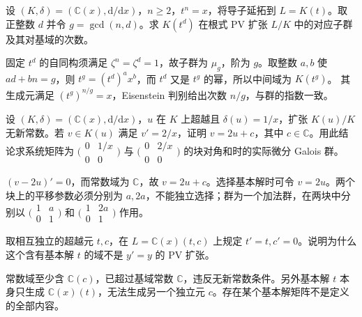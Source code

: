 \begin{exercise}
	设 \((K,\delta)=(\mathbb C(x),\mathrm d/\mathrm dx)\)，\(n\ge2\)，\(t^n=x\)，将导子延拓到 \(L=K(t)\)。取正整数 \(d\) 并令 \(g=\gcd(n,d)\)。求 \(K(t^d)\) 在根式 PV 扩张 \(L/K\) 中的对应子群及其对基域的次数。
\end{exercise}
\begin{solution}
	固定 \(t^d\) 的自同构须满足 \(\zeta^n=\zeta^d=1\)，故子群为 \(\mu_g\)，阶为 \(g\)。取整数 \(a,b\) 使 \(ad+bn=g\)，则 \(t^g=(t^d)^ax^b\)，而 \(t^d\) 又是 \(t^g\) 的幂，所以中间域为 \(K(t^g)\)。 其生成元满足 \((t^g)^{n/g}=x\)，Eisenstein 判别给出次数 \(n/g\)，与群的指数一致。
\end{solution}

\begin{exercise}
	设 \((K,\delta)=(\mathbb C(x),\mathrm d/\mathrm dx)\)，\(u\) 在 \(K\) 上超越且 \(\delta(u)=1/x\)，扩张 \(K(u)/K\) 无新常数。若 \(v\in K(u)\) 满足 \(v'=2/x\)，证明 \(v=2u+c\)，其中 \(c\in\mathbb C\)。用此结论求系统矩阵为 \(\bigl(\begin{smallmatrix}0&1/x\\0&0\end{smallmatrix}\bigr)\) 与 \(\bigl(\begin{smallmatrix}0&2/x\\0&0\end{smallmatrix}\bigr)\) 的块对角和时的实际微分 Galois 群。
\end{exercise}
\begin{solution}
	\((v-2u)'=0\)，而常数域为 \(\mathbb C\)，故 \(v=2u+c\)。选择基本解时可令 \(v=2u\)。两个块上的平移参数必须分别为 \(a,2a\)，不能独立选择；群为一个加法群，在两块中分别以
	\(\bigl(\begin{smallmatrix}1&a\\0&1\end{smallmatrix}\bigr)\) 和
	\(\bigl(\begin{smallmatrix}1&2a\\0&1\end{smallmatrix}\bigr)\) 作用。
\end{solution}

\begin{exercise}
	取相互独立的超越元 \(t,c\)，在 \(L=\mathbb C(x)(t,c)\) 上规定 \(t'=t,c'=0\)。说明为什么这个含有基本解 \(t\) 的域不是 \(y'=y\) 的 PV 扩张。
\end{exercise}
\begin{solution}
	常数域至少含 \(\mathbb C(c)\)，已超过基域常数 \(\mathbb C\)，违反无新常数条件。另外基本解 \(t\) 本身只生成 \(\mathbb C(x)(t)\)，无法生成另一个独立元 \(c\)。存在某个基本解矩阵不是定义的全部内容。
\end{solution}

